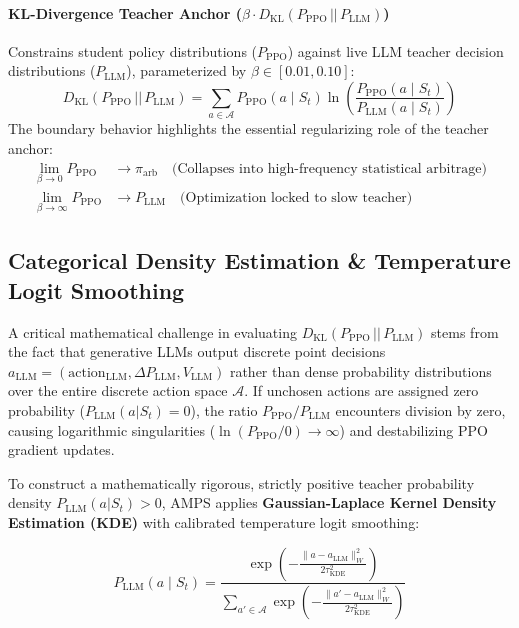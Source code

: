 \paragraph{KL-Divergence Teacher Anchor ($\beta \cdot D_{\text{KL}}(P_{\text{PPO}} \,||\, P_{\text{LLM}})$)}
Constrains student policy distributions ($P_{\text{PPO}}$) against live LLM teacher decision distributions ($P_{\text{LLM}}$), parameterized by $\beta \in [0.01, 0.10]$:
\begin{equation}
    D_{\text{KL}}(P_{\text{PPO}} \,||\, P_{\text{LLM}}) = \sum_{a \in \mathcal{A}} P_{\text{PPO}}(a \mid S_t) \ln \left( \frac{P_{\text{PPO}}(a \mid S_t)}{P_{\text{LLM}}(a \mid S_t)} \right)
\end{equation}
The boundary behavior highlights the essential regularizing role of the teacher anchor:
\begin{align}
    \lim_{\beta \to 0} P_{\text{PPO}} &\to \pi_{\text{arb}} \quad \text{(Collapses into high-frequency statistical arbitrage)} \\
    \lim_{\beta \to \infty} P_{\text{PPO}} &\to P_{\text{LLM}} \quad \text{(Optimization locked to slow teacher)}
\end{align}

\subsection{Categorical Density Estimation \& Temperature Logit Smoothing}

A critical mathematical challenge in evaluating $D_{\text{KL}}(P_{\text{PPO}} \,||\, P_{\text{LLM}})$ stems from the fact that generative LLMs output discrete point decisions $a_{\text{LLM}} = (\text{action}_{\text{LLM}}, \Delta P_{\text{LLM}}, V_{\text{LLM}})$ rather than dense probability distributions over the entire discrete action space $\mathcal{A}$. If unchosen actions are assigned zero probability ($P_{\text{LLM}}(a | S_t) = 0$), the ratio $P_{\text{PPO}} / P_{\text{LLM}}$ encounters division by zero, causing logarithmic singularities ($\ln(P_{\text{PPO}} / 0) \to \infty$) and destabilizing PPO gradient updates.

To construct a mathematically rigorous, strictly positive teacher probability density $P_{\text{LLM}}(a | S_t) > 0$, AMPS applies \textbf{Gaussian-Laplace Kernel Density Estimation (KDE)} with calibrated temperature logit smoothing:

\begin{equation}
    P_{\text{LLM}}(a \mid S_t) = \frac{\exp\left( - \frac{\|a - a_{\text{LLM}}\|_W^2}{2\tau_{\text{KDE}}^2} \right)}{\sum_{a' \in \mathcal{A}} \exp\left( - \frac{\|a' - a_{\text{LLM}}\|_W^2}{2\tau_{\text{KDE}}^2} \right)}
\end{equation}


